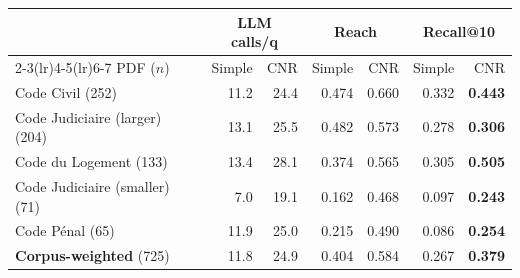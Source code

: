 \begin{tabular}{lrrrrrr}
\toprule
 & \multicolumn{2}{c}{LLM calls/q} & \multicolumn{2}{c}{Reach} & \multicolumn{2}{c}{Recall@10} \\
\cmidrule(lr){2-3}\cmidrule(lr){4-5}\cmidrule(lr){6-7}
PDF ($n$) & Simple & CNR & Simple & CNR & Simple & CNR \\
\midrule
Code Civil (252) & 11.2 & 24.4 & 0.474 & 0.660 & 0.332 & \textbf{0.443} \\
Code Judiciaire (larger) (204) & 13.1 & 25.5 & 0.482 & 0.573 & 0.278 & \textbf{0.306} \\
Code du Logement (133) & 13.4 & 28.1 & 0.374 & 0.565 & 0.305 & \textbf{0.505} \\
Code Judiciaire (smaller) (71) & 7.0 & 19.1 & 0.162 & 0.468 & 0.097 & \textbf{0.243} \\
Code Pénal (65) & 11.9 & 25.0 & 0.215 & 0.490 & 0.086 & \textbf{0.254} \\
\midrule
\textbf{Corpus-weighted} (725) & 11.8 & 24.9 & 0.404 & 0.584 & 0.267 & \textbf{0.379} \\
\bottomrule
\end{tabular}
